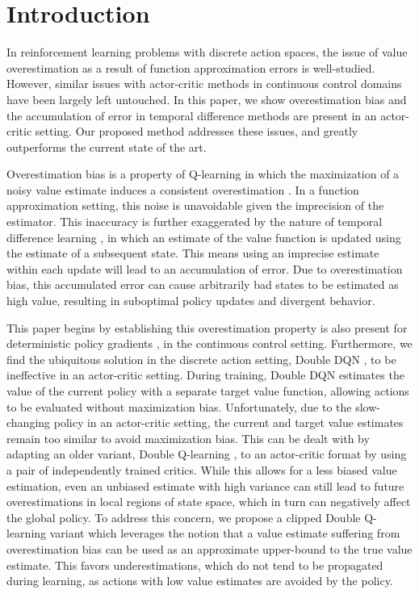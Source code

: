 \documentclass{article}
\begin{document}
\section{Introduction}

In reinforcement learning problems with discrete action spaces, the issue of value overestimation as a result of function approximation errors is well-studied. However, similar issues with actor-critic methods in continuous control domains have been largely left untouched. In this paper, we show overestimation bias and the accumulation of error in temporal difference methods are present in an actor-critic setting. Our proposed method addresses these issues, and greatly outperforms the current state of the art.

Overestimation bias is a property of Q-learning in which the maximization of a noisy value estimate induces a consistent overestimation \cite{thrun1993bias}. In a function approximation setting, this noise is unavoidable given the imprecision of the estimator. This inaccuracy is further exaggerated by the nature of temporal difference learning \cite{sutton1988tdlearning}, in which an estimate of the value function is updated using the estimate of a subsequent state. This means using an imprecise estimate within each update will lead to an accumulation of error.
Due to overestimation bias, this accumulated error can cause arbitrarily bad states to be estimated as high value, resulting in suboptimal policy updates and divergent behavior.

This paper begins by establishing this overestimation property is also present for deterministic policy gradients \cite{DPG}, in the continuous control setting. Furthermore, we find the ubiquitous solution in the discrete action setting, Double DQN \cite{DoubleDQN}, to be ineffective in an actor-critic setting. During training, Double DQN estimates the value of the current policy with a separate target value function, allowing actions to be evaluated without maximization bias. Unfortunately, due to the slow-changing policy in an actor-critic setting, the current and target value estimates remain too similar to avoid maximization bias. This can be dealt with by adapting an older variant, Double Q-learning \cite{hasselt2010double}, to an actor-critic format by using a pair of independently trained critics. While this allows for a less biased value estimation, even an unbiased estimate with high variance can still lead to future overestimations in local regions of state space, which in turn can negatively affect the global policy. To address this concern, we propose a clipped Double Q-learning variant which leverages the notion that a value estimate suffering from overestimation bias can be used as an approximate upper-bound to the true value estimate. This favors underestimations, which do not tend to be propagated during learning, as actions with low value estimates are avoided by the policy.
\end{document}
